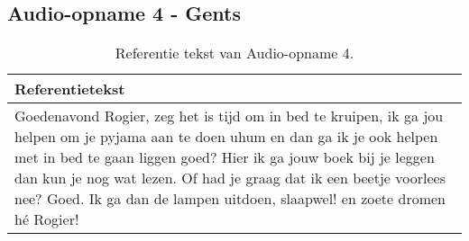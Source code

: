 \subsection{Audio-opname 4 - Gents}
\begin{table}[htbp]
    \centering

    \label{tab:groundtruth_sample4}
    \begin{tabularx}{\textwidth}{|X|}
        \hline
        \textbf{Referentietekst} \\
        \hline
        Goedenavond Rogier, zeg het is tijd om in bed te kruipen, ik ga jou helpen om je pyjama aan te doen uhum en dan ga ik je ook helpen met in bed te gaan liggen goed? Hier ik ga jouw boek bij je leggen dan kun je nog wat lezen. Of had je graag dat ik een beetje voorlees nee? Goed. Ik ga dan de lampen uitdoen, slaapwel! en zoete dromen hé Rogier! \\
        \hline
    \end{tabularx}
    \caption{Referentie tekst van Audio-opname 4.}
\end{table}

